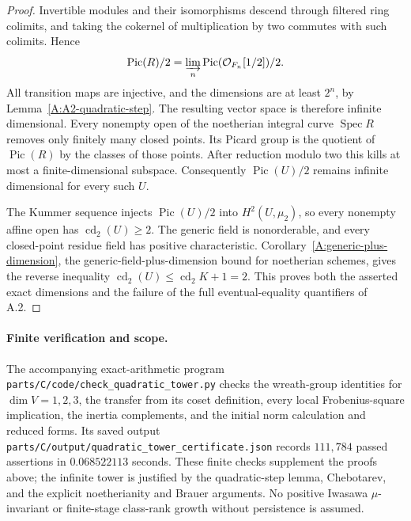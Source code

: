 \begin{proof}
Invertible modules and their isomorphisms descend through
filtered ring colimits, and taking the cokernel of multiplication
by two commutes with such colimits. Hence
\[
 \operatorname{Pic}(R)/2
     =\varinjlim_n \operatorname{Pic}(\mathcal O_{F_n}[1/2])/2.
\]
All transition maps are injective, and the dimensions are at least
$2^n$, by Lemma~\ref{A:A2-quadratic-step}. The resulting vector
space is therefore infinite dimensional. Every nonempty open
of the noetherian integral curve $\operatorname{Spec}R$ removes
only finitely many closed points. Its Picard group is the quotient
of $\operatorname{Pic}(R)$ by the classes of those points.
After reduction modulo two this kills at most a finite-dimensional
subspace. Consequently $\operatorname{Pic}(U)/2$ remains infinite
dimensional for every such $U$.

The Kummer sequence injects $\operatorname{Pic}(U)/2$ into
$H^2(U,\mu_2)$, so every nonempty affine open has
$\operatorname{cd}_2(U)\ge2$. The generic field is nonorderable,
and every closed-point residue field has positive characteristic.
Corollary~\ref{A:generic-plus-dimension},
the generic-field-plus-dimension bound for noetherian schemes,
gives the reverse
inequality $\operatorname{cd}_2(U)\le\operatorname{cd}_2K+1=2$.
This proves both the asserted exact dimensions and the failure
of the full eventual-equality quantifiers of A.2.
\end{proof}

\paragraph{Finite verification and scope.}
The accompanying exact-arithmetic program
\nolinkurl{parts/C/code/check_quadratic_tower.py} checks the wreath-group
identities for $\dim V=1,2,3$, the transfer from its coset definition,
every local Frobenius-square implication, the inertia complements,
and the initial norm calculation and reduced forms. Its saved output
\nolinkurl{parts/C/output/quadratic_tower_certificate.json} records
$111{,}784$ passed assertions in $0.068522113$ seconds. These finite checks
supplement the proofs above; the infinite tower is justified by the
quadratic-step lemma, Chebotarev, and the explicit noetherianity and
Brauer arguments. No positive Iwasawa $\mu$-invariant or finite-stage
class-rank growth without persistence is assumed.
